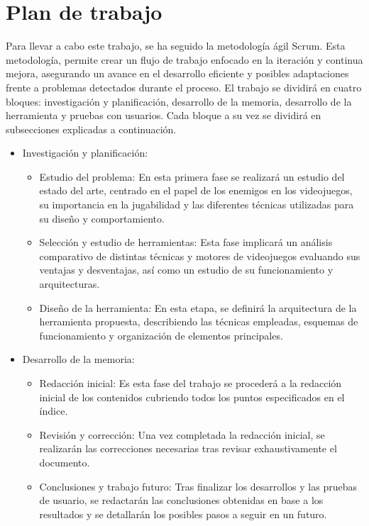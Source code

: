 \section{Plan de trabajo}
Para llevar a cabo este trabajo, se ha seguido la metodología ágil Scrum. Esta metodología, permite crear un flujo de trabajo enfocado en la iteración y continua mejora, asegurando un avance en el desarrollo eficiente y posibles adaptaciones frente a problemas detectados durante el proceso. 
El trabajo se dividirá en cuatro bloques: investigación y planificación, desarrollo de la memoria, desarrollo de la herramienta y pruebas con usuarios.
Cada bloque a su vez se dividirá en subsecciones explicadas a continuación.
\begin{itemize}
    \item  Investigación y planificación:
	\begin{itemize}
	    \item  Estudio del problema: En esta primera fase se realizará un estudio del estado del arte, centrado en el papel de los enemigos en los videojuegos, su importancia en la jugabilidad y las diferentes técnicas utilizadas para su diseño y comportamiento.
	    \item Selección y estudio de herramientas: Esta fase implicará un análisis comparativo de distintas técnicas y motores de videojuegos evaluando sus ventajas y desventajas, así como un estudio de su funcionamiento y  arquitecturas.
	    \item Diseño de la herramienta: En esta etapa, se definirá la arquitectura de la herramienta propuesta, describiendo las técnicas empleadas, esquemas de funcionamiento y organización de elementos principales.
	\end{itemize}
  \item Desarrollo de la memoria: 
	\begin{itemize}
	    \item  Redacción inicial: Es esta fase del trabajo se procederá a la redacción inicial de los contenidos cubriendo todos los puntos especificados en el índice.
	    \item Revisión y corrección: Una vez completada la redacción inicial, se realizarán las correcciones necesarias tras revisar exhaustivamente el documento.
	    \item Conclusiones y trabajo futuro: Tras finalizar los desarrollos y las pruebas de usuario, se redactarán las conclusiones obtenidas en base a los resultados y se detallarán los posibles pasos a seguir en un futuro.
	\end{itemize}

\end{itemize}
